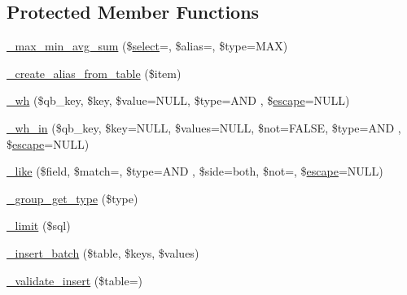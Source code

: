 \subsection*{Protected Member Functions}
\begin{DoxyCompactItemize}
\item 
\mbox{\hyperlink{class_c_i___d_b__query__builder_aea731223718d87a26bb6dc676ee4ee8c}{\+\_\+max\+\_\+min\+\_\+avg\+\_\+sum}} (\$\mbox{\hyperlink{class_c_i___d_b__query__builder_a406a7ea81e717e56496f61baf3e03f44}{select}}=\textquotesingle{}\textquotesingle{}, \$alias=\textquotesingle{}\textquotesingle{}, \$type=\textquotesingle{}M\+AX\textquotesingle{})
\item 
\mbox{\hyperlink{class_c_i___d_b__query__builder_a194edea7be9a8636b67b7d2c8a3de04e}{\+\_\+create\+\_\+alias\+\_\+from\+\_\+table}} (\$item)
\item 
\mbox{\hyperlink{class_c_i___d_b__query__builder_a616af9ae6c40b3fe7074a8517207934f}{\+\_\+wh}} (\$qb\+\_\+key, \$key, \$value=N\+U\+LL, \$type=\textquotesingle{}A\+ND \textquotesingle{}, \$\mbox{\hyperlink{class_c_i___d_b__driver_ac8f37ca5703d4558c732e692194f8cd6}{escape}}=N\+U\+LL)
\item 
\mbox{\hyperlink{class_c_i___d_b__query__builder_a4c7b73516bfa57a10d7b9d3acbb66b40}{\+\_\+wh\+\_\+in}} (\$qb\+\_\+key, \$key=N\+U\+LL, \$values=N\+U\+LL, \$not=F\+A\+L\+SE, \$type=\textquotesingle{}A\+ND \textquotesingle{}, \$\mbox{\hyperlink{class_c_i___d_b__driver_ac8f37ca5703d4558c732e692194f8cd6}{escape}}=N\+U\+LL)
\item 
\mbox{\hyperlink{class_c_i___d_b__query__builder_abe8f3477d4b15bf422fc52ba753056b5}{\+\_\+like}} (\$field, \$match=\textquotesingle{}\textquotesingle{}, \$type=\textquotesingle{}A\+ND \textquotesingle{}, \$side=\textquotesingle{}both\textquotesingle{}, \$not=\textquotesingle{}\textquotesingle{}, \$\mbox{\hyperlink{class_c_i___d_b__driver_ac8f37ca5703d4558c732e692194f8cd6}{escape}}=N\+U\+LL)
\item 
\mbox{\hyperlink{class_c_i___d_b__query__builder_a0101619da9c48cfa269730ace38a774a}{\+\_\+group\+\_\+get\+\_\+type}} (\$type)
\item 
\mbox{\hyperlink{class_c_i___d_b__query__builder_a3a02ea06541b8ecc25a33a61651562c8}{\+\_\+limit}} (\$sql)
\item 
\mbox{\hyperlink{class_c_i___d_b__query__builder_a1978e1358c812587a46e242630365099}{\+\_\+insert\+\_\+batch}} (\$table, \$keys, \$values)
\item 
\mbox{\hyperlink{class_c_i___d_b__query__builder_acbc0cb4b9bd889fa2ffc5086f65a88a1}{\+\_\+validate\+\_\+insert}} (\$table=\textquotesingle{}\textquotesingle{})

\end{DoxyCompactItemize}
